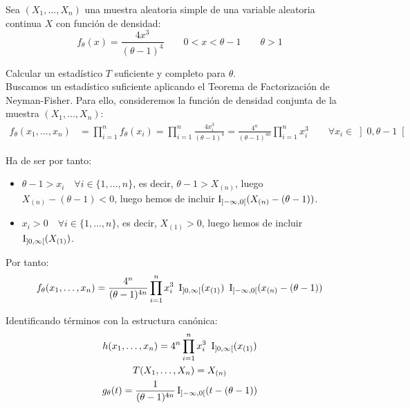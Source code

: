 \begin{ejercicio}[Reto]
    Sea $(X_1, \ldots, X_n)$ una muestra aleatoria simple de una variable aleatoria continua $X$ con función de densidad:
    \begin{equation*}
        f_\theta(x) = \frac{4x^3}{(\theta-1)^4}\qquad 0<x<\theta-1\qquad \theta>1
    \end{equation*}

    Calcular un estadístico $T$ suficiente y completo para $\theta$.\\

    Buscamos un estadístico suficiente aplicando el Teorema de Factorización de Neyman-Fisher. Para ello, consideremos la función de densidad conjunta de la muestra $(X_1, \ldots, X_n)$:
    \begin{align*}
        f_\theta(x_1, \ldots, x_n) &= \prod_{i=1}^{n}f_\theta(x_i) = \prod_{i=1}^{n}\frac{4x_i^3}{(\theta-1)^4}
        = \frac{4^n}{(\theta-1)^{4n}} \prod_{i=1}^{n} x_i^3
        \qquad \forall x_i\in \left]0,\theta-1\right[ 
    \end{align*}

    Ha de ser por tanto:
    \begin{itemize}
        \item $\theta-1 > x_i \quad \forall i \in \{1,\ldots,n\}$, es decir, $\theta-1 > X_{(n)}$, luego $X_{(n)}-(\theta-1)<0$, luego hemos de incluir $\operatorname{I}_{\left]-\infty,0\right[}(X_{(n)}-(\theta-1))$.
        \item $x_i > 0 \quad \forall i \in \{1,\ldots,n\}$, es decir, $X_{(1)} > 0$, luego hemos de incluir $\operatorname{I}_{\left]0,\infty\right[}(X_{(1)})$.
    \end{itemize}

    Por tanto:
    \begin{equation*}
        f_\theta(x_1, \ldots, x_n) = \frac{4^n}{(\theta-1)^{4n}} \prod_{i=1}^{n} x_i^3\  \ind_{\left]0,\infty\right[}(x_{(1)})\ \ind_{\left]-\infty,0\right[}(x_{(n)}-(\theta-1))
    \end{equation*}

    Identificando términos con la estructura canónica:
    \begin{gather*}
        h(x_1, \ldots, x_n) = 4^n \prod_{i=1}^{n} x_i^3\  \operatorname{I}_{\left]0,\infty\right[}(x_{(1)}) \\
        T(X_1, \ldots, X_n) = X_{(n)} \\
        g_\theta(t) = \frac{1}{(\theta-1)^{4n}}\operatorname{I}_{\left]-\infty,0\right[}(t-(\theta-1))
    \end{gather*}


\end{ejercicio}
